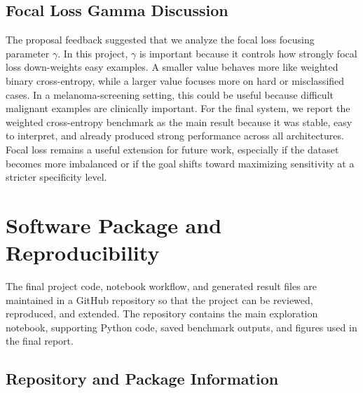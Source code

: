 \documentclass{article}
\begin{document}
\subsection{Focal Loss Gamma Discussion}
The proposal feedback suggested that we analyze the focal loss focusing parameter $\gamma$. In this
project, $\gamma$ is important because it controls how strongly focal loss down-weights easy examples.
A smaller value behaves more like weighted binary cross-entropy, while a larger value focuses more
on hard or misclassified cases. In a melanoma-screening setting, this could be useful because difficult
malignant examples are clinically important.
For the final system, we report the weighted cross-entropy benchmark as the main result because it
was stable, easy to interpret, and already produced strong performance across all architectures.
Focal loss remains a useful extension for future work, especially if the dataset becomes more
imbalanced or if the goal shifts toward maximizing sensitivity at a stricter specificity level.
%
\section{Software Package and Reproducibility}

The final project code, notebook workflow, and generated result files are maintained in a GitHub
repository so that the project can be reviewed, reproduced, and extended. The repository contains the
main exploration notebook, supporting Python code, saved benchmark outputs, and figures used in
the final report.

\subsection{Repository and Package Information}
\end{document}
